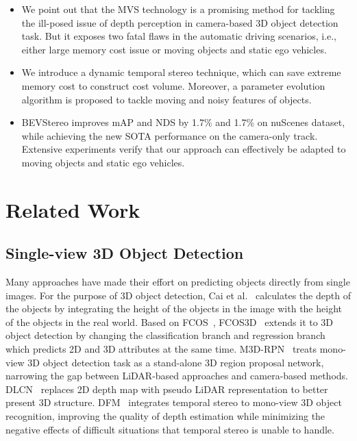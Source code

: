 \documentclass[letterpaper]{article} \usepackage[]{aaai23}  \usepackage{times}  \usepackage{helvet}  \usepackage{courier}  \usepackage[hyphens]{url}  \usepackage{graphicx} \urlstyle{rm} \def\UrlFont{\rm}  \usepackage{natbib}  \usepackage{caption} \frenchspacing  \setlength{\pdfpagewidth}{8.5in} \setlength{\pdfpageheight}{11in} \usepackage{algorithm}
\begin{document}
\begin{itemize}
\item We point out that the MVS technology is a promising method for tackling the ill-posed issue of depth perception in camera-based 3D object detection task. But it exposes two fatal flaws in the automatic driving scenarios, i.e., either large memory cost issue or moving objects and static ego vehicles.

\item We introduce a dynamic temporal stereo technique, which can save extreme memory cost to construct cost volume. Moreover, a parameter evolution algorithm is proposed to tackle moving and noisy features of objects. 



\item BEVStereo improves mAP and NDS by 1.7\% and 1.7\% on nuScenes dataset, while achieving the new SOTA performance on the camera-only track. Extensive experiments verify that our approach can effectively be adapted to moving objects and static ego vehicles.






\end{itemize}








\section{Related Work}
\subsection{Single-view 3D Object Detection}
Many approaches have made their effort on predicting objects directly from single images. For the purpose of 3D object detection, Cai et al.~\cite{cai2020monocular} calculates the depth of the objects by integrating the height of the objects in the image with the height of the objects in the real world. Based on FCOS~\cite{tian2019fcos}, FCOS3D~\cite{wang2021fcos3d} extends it to 3D object detection by changing the  classification branch and regression branch which predicts 2D and 3D attributes at the same time. M3D-RPN~\cite{brazil2019m3d} treats mono-view 3D object detection task as a stand-alone 3D region proposal network, narrowing the gap between LiDAR-based approaches and camera-based methods. DLCN~\cite{ding2020learning} replaces 2D depth map with pseudo LiDAR representation to better present 3D structure. DFM~\cite{wang2022monocular} integrates temporal stereo to mono-view 3D object recognition, improving the quality of depth estimation while minimizing the negative effects of difficult situations that temporal stereo is unable to handle.
\end{document}
